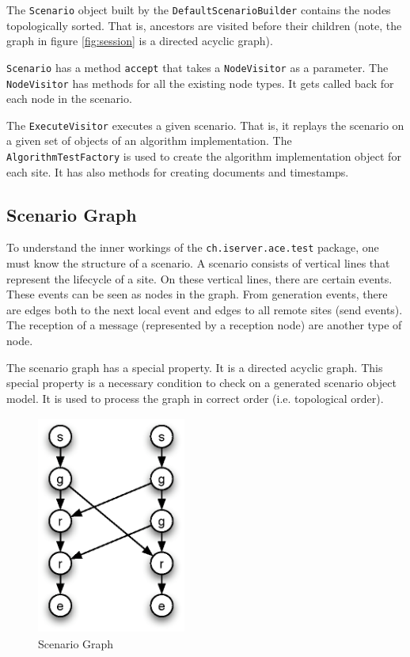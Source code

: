 \documentclass[11pt,a4paper]{article}
\begin{document}
The \texttt{Scenario} object built by the \texttt{DefaultScenarioBuilder} contains the nodes topologically sorted. That is, ancestors are visited before their children (note, the graph in figure \ref{fig:session} is a directed acyclic graph). 

\texttt{Scenario} has a method \texttt{accept} that takes a \texttt{NodeVisitor} as a parameter. The \texttt{NodeVisitor} has methods for all the existing node types. It gets called back for each node in the scenario. 

The \texttt{ExecuteVisitor} executes a given scenario. That is, it replays the scenario on a given set of objects of an algorithm implementation. The \texttt{AlgorithmTestFactory} is used to create the algorithm implementation object for each site. It has also methods for creating documents and timestamps.


\subsection{Scenario Graph}
To understand the inner workings of the \texttt{ch.iserver.ace.test} package, one must know the structure of a scenario. A scenario consists of vertical lines that represent the lifecycle of a site. On these vertical lines, there are certain events. These events can be seen as nodes in the graph. From generation events, there are edges both to the next local event and edges to all remote sites (send events). The reception of a message (represented by a reception node) are another type of node.

The scenario graph has a special property. It is a directed acyclic graph. This special property is a necessary condition to check on a generated scenario object model. It is used to process the graph in correct order (i.e. topological order).

\begin{figure}[H]
 \centering
 \includegraphics[width=4.9cm,height=7.2cm]{../../images/testframework.eps}
 \caption{Scenario Graph}
 \label{fig:graph}
\end{figure}
\end{document}
